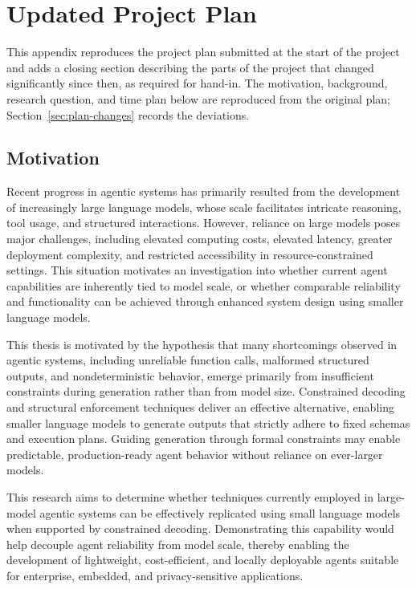 \chapter{Updated Project Plan}
\label{app:project-plan-update}

This appendix reproduces the project plan submitted at the start of the
project and adds a closing section describing the parts of the project
that changed significantly since then, as required for hand-in. The
motivation, background, research question, and time plan below are
reproduced from the original plan; Section~\ref{sec:plan-changes} records
the deviations.

\section{Motivation}

Recent progress in agentic systems has primarily resulted from the
development of increasingly large language models, whose scale facilitates
intricate reasoning, tool usage, and structured interactions.
However, reliance on large models poses major challenges, including elevated
computing costs, elevated latency, greater deployment complexity, and
restricted accessibility in resource-constrained settings.
This situation motivates an investigation into whether current agent
capabilities are inherently tied to model scale, or whether comparable
reliability and functionality can be achieved through enhanced system design
using smaller language models.

This thesis is motivated by the hypothesis that many shortcomings observed in
agentic systems, including unreliable function calls, malformed structured
outputs, and nondeterministic behavior, emerge primarily from insufficient
constraints during generation rather than from model size.
Constrained decoding and structural enforcement techniques deliver an
effective alternative, enabling smaller language models to generate outputs
that strictly adhere to fixed schemas and execution plans.
Guiding generation through formal constraints may enable predictable,
production-ready agent behavior without reliance on ever-larger models.

This research aims to determine whether techniques currently employed in
large-model agentic systems can be effectively replicated using small
language models when supported by constrained decoding.
Demonstrating this capability would help decouple agent reliability from
model scale, thereby enabling the development of lightweight, cost-efficient,
and locally deployable agents suitable for enterprise, embedded, and
privacy-sensitive applications.

